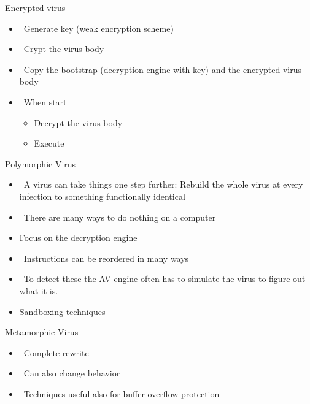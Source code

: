 \documentclass{beamer}
\begin{document}
\begin{frame}{Encrypted virus }
  \begin{itemize}
  \item  Generate key (weak encryption scheme)
  \item  Crypt the virus body
  \item  Copy the bootstrap (decryption engine with key)
    and the encrypted virus body
  \item  When start
  \begin{itemize}
    \item Decrypt the virus body
    \item Execute
  \end{itemize}
  \end{itemize}
\end{frame}


\begin{frame}{Polymorphic Virus }
  \begin{itemize}
  \item  A virus can take things one step further: 
    Rebuild the whole virus at every infection to 
    something functionally identical 
  \item  There are many ways to do nothing on a 
    computer 
  \item Focus on the decryption engine
  \item  Instructions can be reordered in many ways 
  \item  To detect these the AV engine often has to 
    simulate the virus to figure out what it is.
  \item Sandboxing techniques
  \end{itemize}
\end{frame}

\begin{frame}{Metamorphic Virus}
  \begin{itemize}
  \item  Complete rewrite 
  \item  Can also change behavior
  \item  Techniques useful also for buffer overflow protection
  \end{itemize}
\end{frame}
 
\end{document}
